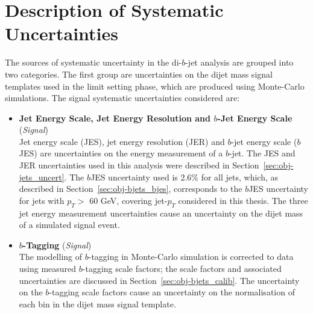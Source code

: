 \section{Description of Systematic Uncertainties}
\label{sec:lim-syst}

The sources of systematic uncertainty in the di-$b$-jet analysis are grouped into two categories.
The first group are uncertainties on the dijet mass signal templates used in the limit setting phase, which are produced using Monte-Carlo simulations.
The signal systematic uncertainties considered are:
\vspace{-0.5em}
\begin{itemize}[leftmargin=*]
\item\textbf{Jet Energy Scale, Jet Energy Resolution  and $b$-Jet Energy Scale} \hspace{1mm} (\textit{Signal})\\
  Jet energy scale (JES), jet energy resolution (JER) and  $b$-jet energy scale ($b$JES) are uncertainties
  on the energy measurement of a $b$-jet.
  The JES and JER uncertainties used in this analysis were described in Section~\ref{sec:obj-jets_uncert}.
  The $b$JES uncertainty used is 2.6\% for all jets, which, 
  as described in Section~\ref{sec:obj-bjets_bjes}, corresponds to the $b$JES uncertainty for jets with $p_T >$ 60 GeV,
  covering jet-$p_T$ considered in this thesis.
  The three jet energy measurement uncertainties cause an uncertainty on the dijet mass of a simulated signal event.\vspace{0.5em}

\item\textbf{$b$-Tagging} \hspace{1mm} (\textit{Signal})\\
  The modelling of $b$-tagging in Monte-Carlo simulation is corrected to data using measured $b$-tagging scale factors;
  the scale factors and associated uncertainties are discussed in Section~\ref{sec:obj-bjets_calib}.
  The uncertainty on the $b$-tagging scale factors cause an uncertainty on the normalisation of each bin in the dijet mass signal template.
  \vspace{0.3em}


\end{itemize}
